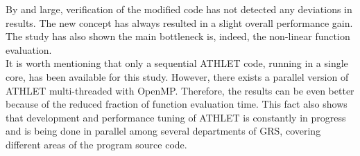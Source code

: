 By and large, verification of the modified code has not detected any deviations in results. The new concept has always resulted in a slight overall performance gain. The study has also shown the main bottleneck is, indeed, the non-linear function evaluation.\\


It is worth mentioning that only a sequential ATHLET code, running in a single core, has been available for this study. However, there exists a parallel version of ATHLET multi-threaded with OpenMP. Therefore, the results can be even better because of the reduced fraction of function evaluation time. This fact also shows that development and performance tuning of ATHLET is constantly in progress and is being done in parallel among several departments of GRS, covering different areas of the program source code.\\


